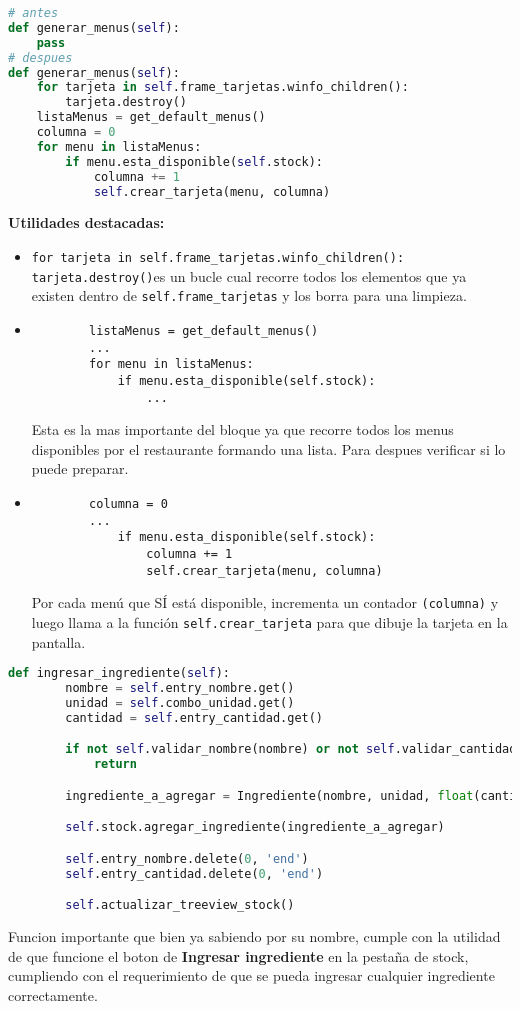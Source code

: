 \documentclass[a4paper,12pt]{article}
\begin{document}
\begin{lstlisting}[language=Python, caption={Implementaciones de codigo}, frame=single]
# antes
def generar_menus(self):
    pass
# despues
def generar_menus(self):
    for tarjeta in self.frame_tarjetas.winfo_children():
        tarjeta.destroy()
    listaMenus = get_default_menus()
    columna = 0
    for menu in listaMenus:
        if menu.esta_disponible(self.stock):
            columna += 1
            self.crear_tarjeta(menu, columna)
\end{lstlisting}
\textbf{Utilidades destacadas:}
\begin{itemize}
    \item \verb|for tarjeta in self.frame_tarjetas.winfo_children(): tarjeta.destroy()|es un bucle cual recorre todos los elementos que ya existen dentro de \verb|self.frame_tarjetas| y los borra para una limpieza.
    \item \begin{lstlisting}
        listaMenus = get_default_menus()
        ...
        for menu in listaMenus:
            if menu.esta_disponible(self.stock):
                ...
    \end{lstlisting}
    Esta es la mas importante del bloque ya que recorre todos los menus disponibles por el restaurante formando una lista. Para despues verificar si lo puede preparar.
    \item \begin{lstlisting}
        columna = 0
        ...
            if menu.esta_disponible(self.stock):
                columna += 1
                self.crear_tarjeta(menu, columna)
    \end{lstlisting}
    Por cada menú que SÍ está disponible, incrementa un contador \verb|(columna)| y luego llama a la función \verb|self.crear_tarjeta| para que dibuje la tarjeta en la pantalla.
\end{itemize}

\newpage

\begin{lstlisting}[language=Python, caption={Implementaciones de codigo}, frame=single]
    def ingresar_ingrediente(self):
        nombre = self.entry_nombre.get()
        unidad = self.combo_unidad.get()
        cantidad = self.entry_cantidad.get()

        if not self.validar_nombre(nombre) or not self.validar_cantidad(cantidad):
            return

        ingrediente_a_agregar = Ingrediente(nombre, unidad, float(cantidad))

        self.stock.agregar_ingrediente(ingrediente_a_agregar)

        self.entry_nombre.delete(0, 'end')
        self.entry_cantidad.delete(0, 'end')

        self.actualizar_treeview_stock()
\end{lstlisting}
Funcion importante que bien ya sabiendo por su nombre, cumple con la utilidad de que funcione el boton de \textbf{Ingresar ingrediente} en la pestaña de stock, cumpliendo con el requerimiento de que se pueda ingresar cualquier ingrediente correctamente.
\end{document}
